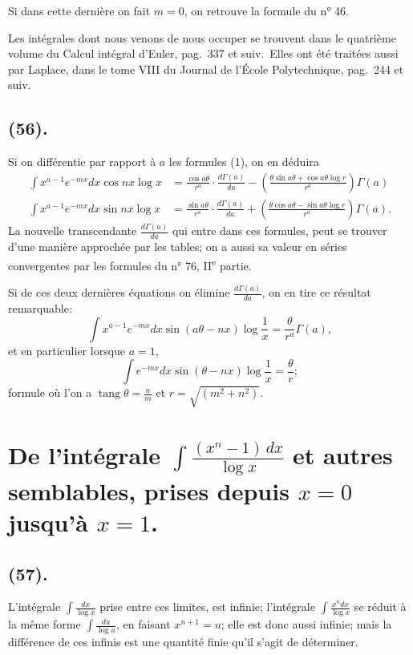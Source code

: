 \documentclass{article}
\begin{document}
Si dans cette dernière on fait $m=0$, on retrouve la formule du n° 46.

Les intégrales dont nous venons de nous occuper se trouvent dans le quatrième volume du Calcul intégral d'Euler, pag.\ 337 et suiv.\ Elles ont été traitées aussi par Laplace, dans le tome VIII du Journal de l'École Polytechnique, pag.\ 244 et suiv.

\subsection*{(56).}

Si on différentie par rapport à $a$ les formules (1), on en déduira
\[ \begin{aligned} \int x^{a-1}e^{-mx}dx\cos nx\log x&=\frac{\cos a\theta}{r^{a}}\cdot\frac{d\Gamma(a)}{da}-\left(\frac{\theta\sin a\theta+\cos a\theta\log r}{r^{a}}\right)\Gamma(a)\\ \int x^{a-1}e^{-mx}dx\sin nx\log x&=\frac{\sin a\theta}{r^{a}}\cdot\frac{d\Gamma(a)}{da}+\left(\frac{\theta\cos a\theta-\sin a\theta\log r}{r^{a}}\right)\Gamma(a). \end{aligned} \tag{5} \]
La nouvelle transcendante $\frac{d\Gamma(a)}{da}$ qui entre dans ces formules, peut se trouver d'une manière approchée par les tables; on a aussi sa valeur en séries convergentes par les formules du n° 76, II\textsuperscript{e} partie.

Si de ces deux dernières équations on élimine $\frac{d\Gamma(a)}{da}$, on en tire ce résultat remarquable:
\[ \int x^{a-1}e^{-mx}dx\sin(a\theta-nx)\log\frac{1}{x}=\frac{\theta}{r^{a}}\Gamma(a), \tag{6} \]
et en particulier lorsque $a=1$,
\[ \int e^{-mx}dx\sin(\theta-nx)\log\frac{1}{x}=\frac{\theta}{r}; \tag{7} \]
formule où l'on a $\operatorname{tang}\theta=\frac{n}{m}$ et $r=\sqrt{(m^{2}+n^{2})}$.


\section*{De l'intégrale $\displaystyle\int\frac{(x^{n}-1)\,dx}{\log x}$ et autres semblables, prises depuis $x=0$ jusqu'à $x=1$.}

\subsection*{(57).}

L'intégrale $\displaystyle\int\frac{dx}{\log x}$ prise entre ces limites, est infinie; l'intégrale $\displaystyle\int\frac{x^{n}dx}{\log x}$ se réduit à la même forme $\displaystyle\int\frac{du}{\log u}$, en faisant $x^{n+1}=u$; elle est donc aussi infinie; mais la différence de ces infinis est une quantité finie qu'il s'agit de déterminer.
\end{document}
